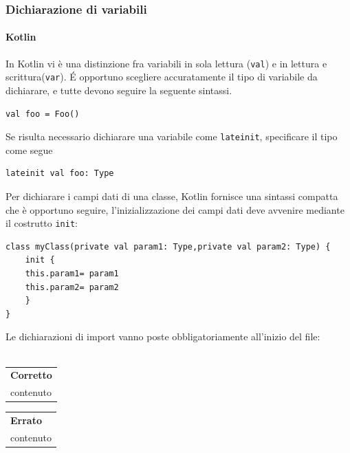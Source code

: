 \subsubsection{Dichiarazione di variabili}

\paragraph{Kotlin}
In Kotlin vi è una distinzione fra variabili in sola lettura (\texttt{val}) e in lettura e scrittura(\texttt{var}). \'E opportuno scegliere accuratamente il tipo di variabile da dichiarare, e tutte devono seguire la seguente sintassi.
\begin{lstlisting}
val foo = Foo() 						
\end{lstlisting}

Se risulta necessario dichiarare una variabile come \texttt{lateinit}, specificare il tipo come segue
\begin{lstlisting}
lateinit val foo: Type							
\end{lstlisting}

Per dichiarare i campi dati di una classe, Kotlin fornisce una sintassi compatta che è opportuno seguire, l'inizializzazione dei campi dati deve avvenire mediante il costrutto \texttt{init}:

\begin{lstlisting}
class myClass(private val param1: Type,private val param2: Type) {	
	init {
	this.param1= param1
	this.param2= param2	
	} 
}
\end{lstlisting}

Le dichiarazioni di import vanno poste obbligatoriamente all'inizio del file:\\\\
\begin{minipage}{0.45\textwidth}
	\begin{tabular}{p{\textwidth}}	
		\textbf{Corretto}
		\begin{lstlisting}
		import java.util.*
		
		class example() {
		\\contenuto
		}
		\end{lstlisting}
	\end{tabular}
\end{minipage}
\hfill
\begin{minipage}{0.45\textwidth}
	\begin{tabular}{|p{\textwidth}}		
		\textbf{Errato}
		\begin{lstlisting}
		class example {
		\\contenuto
		}
		
		import java.util.*
		\end{lstlisting}
	\end{tabular}
	
\end{minipage}

